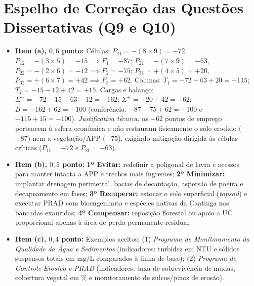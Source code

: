 \section*{Espelho de Correção das Questões Dissertativas (Q9 e Q10)}

\begin{boxGabarito}
  \begin{itemize}[leftmargin=1.5em, itemsep=3pt]
    \item \textbf{Item (a), $0{,}6$ ponto:}
    Células: $P_{11} = -(8 \times 9) = -72$, $P_{12} = -(3 \times 5) = -15 \implies F_1 = -87$; $P_{21} = -(7 \times 9) = -63$, $P_{22} = -(2 \times 6) = -12 \implies F_2 = -75$; $P_{31} = +(4 \times 5) = +20$, $P_{32} = +(6 \times 7) = +42 \implies F_3 = +62$.
    Colunas: $T_1 = -72 - 63 + 20 = -115$; $T_2 = -15 - 12 + 42 = +15$.
    Cargas e balanço: $\Sigma^{-} = -72 - 15 - 63 - 12 = -162$; $\Sigma^{+} = +20 + 42 = +62$; $B = -162 + 62 = -100$ (conferência: $-87 - 75 + 62 = -100$ e $-115 + 15 = -100$).
    \emph{Justificativa técnica:} os $+62$ pontos de emprego pertencem à esfera econômica e não restauram fisicamente o solo erodido ($-87$) nem a vegetação/APP ($-75$), exigindo mitigação dirigida às células críticas ($P_{11} = -72$ e $P_{21} = -63$).
    \item \textbf{Item (b), $0{,}5$ ponto:}
    \textbf{1º Evitar:} redefinir a poligonal de lavra e acessos para manter intacta a APP e trechos mais íngremes; \textbf{2º Minimizar:} implantar drenagem perimetral, bacias de decantação, aspersão de poeira e decapeamento em fases; \textbf{3º Recuperar:} estocar o solo superficial (\textit{topsoil}) e executar PRAD com bioengenharia e espécies nativas da Caatinga nas bancadas exauridas; \textbf{4º Compensar:} reposição florestal ou apoio a UC proporcional apenas à área de perda permanente residual.
    \item \textbf{Item (c), $0{,}4$ ponto:}
    Exemplos aceitos: (1) \emph{Programa de Monitoramento da Qualidade da Água e Sedimentos} (indicadores: turbidez em NTU e sólidos suspensos totais em $\text{mg/L}$ comparados à linha de base); (2) \emph{Programa de Controle Erosivo e PRAD} (indicadores: taxa de sobrevivência de mudas, cobertura vegetal em $\%$ e monitoramento de sulcos/pinos de erosão).
  \end{itemize}
\end{boxGabarito}

